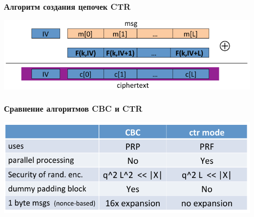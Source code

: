 \documentclass{beamer}
\begin{document}
\begin{frame}
  \frametitle{Алгоритм создания цепочек CTR}

  \includegraphics[width=\linewidth]{images/png/CTR_mode}

\end{frame}


\begin{frame}
  \frametitle{Сравнение алгоритмов CBC и CTR}

  \includegraphics[width=\linewidth]{images/png/CTR_vs_CBC_comparison}

\end{frame}
\end{document}
